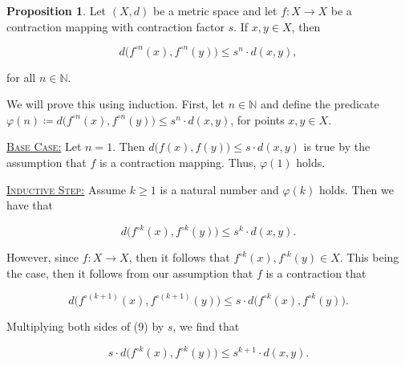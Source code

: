 \documentclass{article}
\makeatletter
\theoremstyle{definition}
\newtheorem{prop}{Proposition}[section]
\theoremstyle{remark}
\let\oldproofname=\proofname
\renewcommand{\proofname}{\bf{\textit{\oldproofname}}}
\theoremstyle{definition}
\renewenvironment{proof}[1][\proofname]{\par
  \pushQED{\qed}%
  \normalfont \topsep6\p@\@plus6\p@\relax
  \list{}{\leftmargin=0mm
          \rightmargin=0mm
          \settowidth{\itemindent}{\itshape#1}%
          \labelwidth=\itemindent
          \parsep=0pt \listparindent=0mm%
  }
  \item[\hskip\labelsep
        \itshape
    #1\@addpunct{.}]\ignorespaces
}{%
  \popQED\endlist\@endpefalse
}
\makeatother
\begin{document}
    \begin{prop}\label{prop:1.5}
        Let $(X,d)$ be a metric space and let $f\colon X\rightarrow X$ be a contraction mapping with contraction factor $s$. If $x,y\in X$, then
    
        \begin{equation*}
            d\big(f^{\circ n}(x),f^{\circ n}(y)\big)\leq s^n\cdot d(x,y),
        \end{equation*}
    
        \noindent for all $n\in\mathbb{N}$.
    \end{prop}
    
    \begin{proof}
        We will prove this using induction. First, let $n\in\mathbb{N}$ and define the predicate $\varphi(n)\coloneqq d\big(f^{\circ n}(x),f^{\circ n}(y)\big)\leq s^n\cdot d(x,y)$, for points $x,y\in X$.
        
        \vspace{4mm}
        
        \hspace{4mm}\underline{\textsc{Base Case:}} Let $n=1$. Then $d\big(f(x),f(y)\big)\leq s\cdot d(x,y)$ is true by the assumption that $f$ is a contraction mapping. Thus, $\varphi(1)$ holds.
        
        \vspace{4mm}
        
        \hspace{4mm}\underline{\textsc{Inductive Step:}} Assume $k\geq 1$ is a natural number and $\varphi(k)$ holds. Then we have that
        
        \begin{equation}
           d\big(f^{\circ k}(x),f^{\circ k}(y)\big)\leq s^k\cdot d(x,y). 
        \end{equation}
        
         However, since $f\colon X\rightarrow X$, then it follows that $f^{\circ k}(x),f^{\circ k}(y)\in X$. This being the case, then it follows from our assumption that $f$ is a contraction that 
        
        \begin{equation}
            d\big(f^{\circ(k+1)}(x),f^{\circ(k+1)}(y)\big)\leq s\cdot d\big(f^{\circ k}(x),f^{\circ k}(y)\big).
        \end{equation}
        
        Multiplying both sides of (9) by $s$, we find that 
        
        \begin{equation}
            s\cdot d\big(f^{\circ k}(x),f^{\circ k}(y)\big)\leq s^{k+1}\cdot d(x,y).
        \end{equation}
        

\end{proof}
\end{document}
